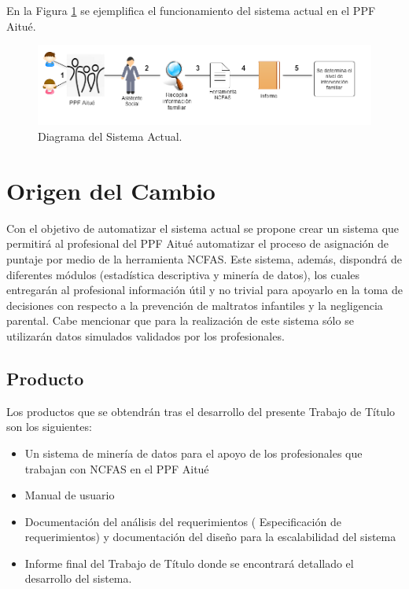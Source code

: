En la Figura \ref{Figura9} se ejemplifica el funcionamiento del sistema actual en el PPF Aitué.



\begin{figure}[htb]
	\label{Figura9}
	\begin{center}
		\includegraphics[scale=0.5]{imagenes/diagramancfas.png}
	\end{center}
	\caption{Diagrama del Sistema Actual.}
\end{figure}





\section{Origen del Cambio}
\vspace{1mm}
\normalsize

Con el objetivo de automatizar el sistema actual se propone crear un sistema que permitirá al profesional del PPF Aitué automatizar el proceso de asignación de puntaje por medio de la herramienta NCFAS. Este sistema, además, dispondrá de diferentes módulos (estadística descriptiva y minería de datos), los cuales entregarán al profesional información útil y no trivial para apoyarlo en la toma de decisiones con respecto a la prevención de maltratos infantiles y la negligencia parental. 
Cabe mencionar que para la realización de este sistema sólo se utilizarán datos simulados validados por los profesionales. 

\subsection{Producto}
\vspace{1mm}
\normalsize

Los productos que se obtendrán tras el desarrollo del presente Trabajo de Título son los siguientes:
\begin{itemize}
	\item Un sistema de minería de datos para el apoyo de los profesionales que trabajan con  NCFAS en el PPF Aitué
	\item Manual de usuario
	\item Documentación del análisis del requerimientos ( Especificación de requerimientos) y documentación del diseño para la escalabilidad del sistema
	\item Informe final del Trabajo de Título donde se encontrará detallado el desarrollo del sistema.
\end{itemize}

